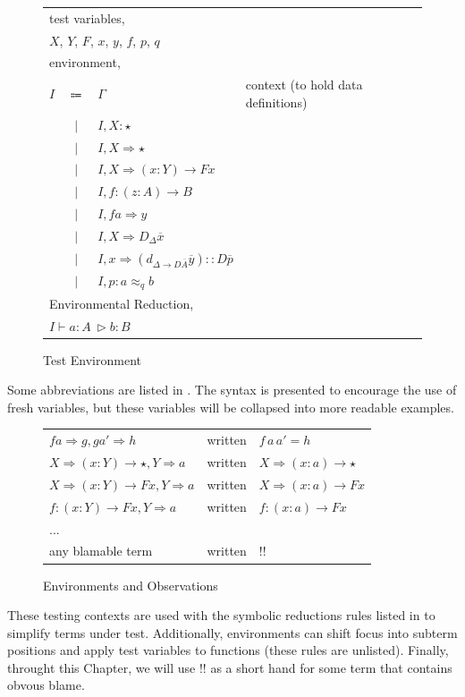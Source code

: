 \begin{figure}
\begin{tabular}{lcll}
\multicolumn{4}{l}{test variables,}\tabularnewline
\multicolumn{4}{l}{$X$, $Y$, $F$, $x$, $y$, $f$, $p$, $q$}\tabularnewline
\multicolumn{4}{l}{environment,}\tabularnewline
$I$ & $\Coloneqq$ & $\varGamma$ & context (to hold data definitions)\tabularnewline
  & $|$ & $I,X:\star$ & \tabularnewline
  & $|$ & $I,X\Rightarrow\star$ & \tabularnewline
  & $|$ & $I,X\Rightarrow\left(x:Y\right)\rightarrow Fx$ & \tabularnewline
  & $|$ & $I,f:\left(z:A\right)\rightarrow B$ & \tabularnewline
  & $|$ & $I,fa\Rightarrow y$ & \tabularnewline
  & $|$ & $I,X\Rightarrow D_{\Delta}\overline{x}$ & \tabularnewline
  & $|$ & $I,x\Rightarrow\left(d_{\Delta\rightarrow D\overline{A}}\overline{y}\right)::D\overline{p}$ & \tabularnewline
  & $|$ & $I,p:a\approx_{q}b$ & \tabularnewline
\multicolumn{4}{l}{Environmental Reduction,}\tabularnewline
\multicolumn{4}{l}{$I\vdash  a:A\ \vartriangleright b:B$}\tabularnewline
\end{tabular}

\caption{Test Environment}
\label{fig:sym-env-obs}
\end{figure}

Some abbreviations are listed in .
The syntax is presented to encourage the use of fresh variables, but these variables will be collapsed into more readable examples.

\begin{figure}
  \begin{tabular}{lcl}
  $fa\Rightarrow g,ga'\Rightarrow h$ & written & $f\,a\,a'=h$\tabularnewline
  $X\Rightarrow\left(x:Y\right)\rightarrow\star,Y\Rightarrow a$ & written & $X\Rightarrow\left(x:a\right)\rightarrow\star$\tabularnewline
  $X\Rightarrow\left(x:Y\right)\rightarrow Fx,Y\Rightarrow a$ & written & $X\Rightarrow\left(x:a\right)\rightarrow Fx$\tabularnewline
  $f:\left(x:Y\right)\rightarrow Fx,Y\Rightarrow a$ & written & $f:\left(x:a\right)\rightarrow Fx$\tabularnewline
  ... &  & \tabularnewline
  any blamable term & written & !!\tabularnewline
  \end{tabular}\caption{Environments and Observations}
  \label{fig:sym-env-obs-abbiv}
  \end{figure}

  

These testing contexts are used with the symbolic reductions rules listed in  to simplify terms under test.
Additionally, environments can shift focus into subterm positions and apply test variables to functions (these rules are unlisted).
Finally, throught this Chapter, we will use $!!$ as a short hand for some term that contains obvous blame.


